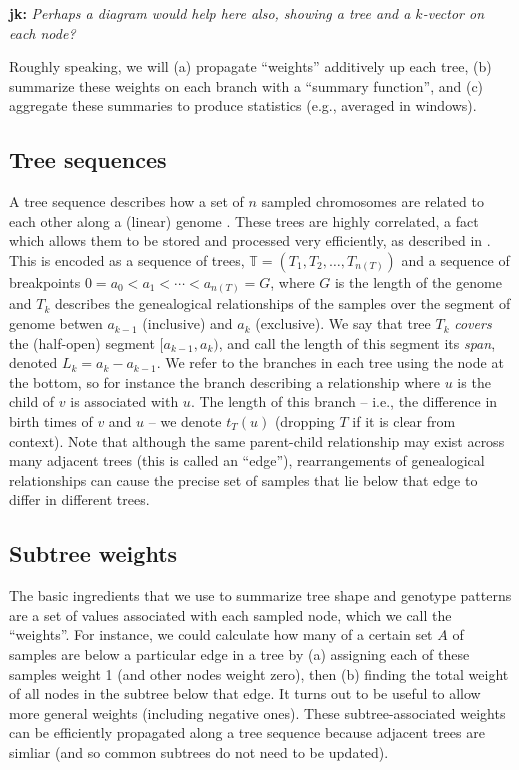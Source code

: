 \documentclass{article}
\newcommand{\treeseq}{\mathbb{T}} %
\newcommand{\jk}[1]{{\color{red}\textbf{jk:} \it #1}}
\begin{document}
\jk{Perhaps a diagram would help here also, showing a tree and a $k$-vector on each
node?}

Roughly speaking, we will
(a) propagate ``weights'' additively up each tree,
(b) summarize these weights on each branch with a ``summary function'',
and (c) aggregate these summaries to produce statistics
(e.g., averaged in windows).


\subsection*{Tree sequences}

A tree sequence describes how a set of $n$ sampled chromosomes
are related to each other along a (linear) genome \citep{kelleher2016efficient}.
These trees are highly correlated,
a fact which allows them to be stored and processed very efficiently,
as described in \citet{kelleher2018efficient}.
This is encoded as a sequence of trees, $\treeseq = (T_1, T_2, \ldots, T_{n(T)})$
and a sequence of breakpoints $0 = a_0 < a_1 < \cdots < a_{n(T)} = G$,
where $G$ is the length of the genome
and $T_k$ describes the genealogical relationships of the samples
over the segment of genome betwen $a_{k-1}$ (inclusive) and $a_k$ (exclusive).
We say that tree $T_k$ \emph{covers} the (half-open) segment $[a_{k-1}, a_k)$,
and call the length of this segment its \emph{span}, denoted $L_k = a_k - a_{k-1}$.
We refer to the branches in each tree using the node at the bottom,
so for instance the branch describing a relationship where $u$ is the child of $v$
is associated with $u$.
The length of this branch -- i.e., the difference in birth times of $v$ and $u$ --
we denote $t_T(u)$ (dropping $T$ if it is clear from context).
Note that although the same parent-child relationship may exist across many adjacent trees
(this is called an ``edge''),
rearrangements of genealogical relationships
can cause the precise set of samples that lie below that edge to differ in different trees.



\subsection*{Subtree weights}

The basic ingredients that we use to summarize tree shape and genotype patterns
are a set of values associated with each sampled node, which we call the ``weights''.
For instance, we could calculate how many of a certain set $A$ of samples
are below a particular edge in a tree
by (a) assigning each of these samples weight 1 (and other nodes weight zero), then
(b) finding the total weight of all nodes in the subtree below that edge.
It turns out to be useful to allow more general weights (including negative ones).
These subtree-associated weights can be efficiently propagated along a tree sequence
because adjacent trees are simliar (and so common subtrees do not need to be updated).
\end{document}
